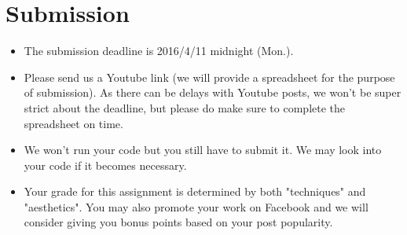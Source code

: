\documentclass[12pt,a4paper]{article}
\begin{document}
\section{Submission}
\begin{itemize}
\item The submission deadline is 2016/4/11 midnight (Mon.).
\item Please send us a Youtube link (we will provide a spreadsheet for the purpose of submission).  As there can be delays with Youtube posts, we won't be super strict about the deadline, but please do make sure to complete the spreadsheet on time.
\item We won't run your code but you still have to submit it. We may look into your code if it becomes necessary.
\item Your grade for this assignment is determined by both "techniques" and "aesthetics". You may also promote your work on Facebook and we will consider giving you bonus points based on your post popularity.
\end{itemize}
\end{document}
